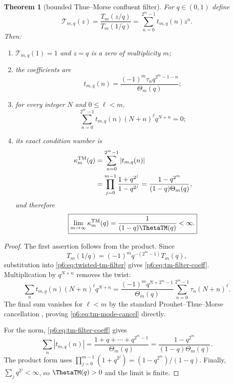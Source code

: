 \documentclass[11pt]{article}
\numberwithin{equation}{section}
\newtheorem{theorem}{Theorem}[section]
\theoremstyle{definition}
\theoremstyle{remark}
\begin{document}
\begin{theorem}[bounded Thue--Morse confluent filter]
\label{p6:thm:tm-filter}
For $q\in(0,1)$ define
\begin{equation}
 \mathcal T_{m,q}(z)
 =\frac{T_m(z/q)}{T_m(1/q)}
 =\sum_{n=0}^{2^m-1}t_{m,q}(n)z^n.
 \label{p6:eq:twisted-tm-filter}
\end{equation}
Then:
\begin{enumerate}
\item $\mathcal T_{m,q}(1)=1$ and $z=q$ is a zero of multiplicity $m$;
\item the coefficients are
\begin{equation}
 t_{m,q}(n)
 =\frac{(-1)^m\tau_nq^{2^m-1-n}}{\Theta_m(q)};
 \label{p6:eq:tm-filter-coeff}
\end{equation}
\item for every integer $N$ and $0\le\ell<m$,
\begin{equation}
 \sum_{n=0}^{2^m-1}t_{m,q}(n)(N+n)^\ell q^{N+n}=0;
 \label{p6:eq:tm-mode-cancel}
\end{equation}
\item its exact condition number is
\begin{align}
 \kappa_m^{\rm TM}(q)
 &=\sum_{n=0}^{2^m-1}|t_{m,q}(n)| \\
 &=\prod_{j=0}^{m-1}\frac{1+q^{2^j}}{1-q^{2^j}}
 =\frac{1-q^{2^m}}{(1-q)\Theta_m(q)},
 \label{p6:eq:tm-condition}
\end{align}
and therefore
\begin{equation}
 \boxed{\displaystyle
 \lim_{m\to\infty}\kappa_m^{\rm TM}(q)
 =\frac{1}{(1-q)\ThetaTM(q)}<\infty.}
 \label{p6:eq:tm-condition-limit}
\end{equation}
\end{enumerate}
\end{theorem}

\begin{proof}
The first assertion follows from the product.  Since
\[
 T_m(1/q)=(-1)^mq^{-(2^m-1)}T_m(q),
\]
substitution into \eqref{p6:eq:twisted-tm-filter} gives
\eqref{p6:eq:tm-filter-coeff}.  Multiplication by $q^{N+n}$ removes the twist:
\[
 \sum_nt_{m,q}(n)(N+n)^\ell q^{N+n}
 =\frac{(-1)^mq^{N+2^m-1}}{\Theta_m(q)}
 \sum_{n=0}^{2^m-1}\tau_n(N+n)^\ell.
\]
The final sum vanishes for $\ell<m$ by the standard Prouhet--Thue--Morse
cancellation \cite{p6:alloucheshallit}, proving \eqref{p6:eq:tm-mode-cancel} directly.

For the norm, \eqref{p6:eq:tm-filter-coeff} gives
\[
 \sum_n|t_{m,q}(n)|
 =\frac{1+q+\cdots+q^{2^m-1}}{\Theta_m(q)}
 =\frac{1-q^{2^m}}{(1-q)\Theta_m(q)}.
\]
The product form uses
$\prod_{j=0}^{m-1}(1+q^{2^j})=(1-q^{2^m})/(1-q)$.
Finally, $\sum_jq^{2^j}<\infty$, so $\ThetaTM(q)>0$ and the limit is finite.
\end{proof}
\end{document}
